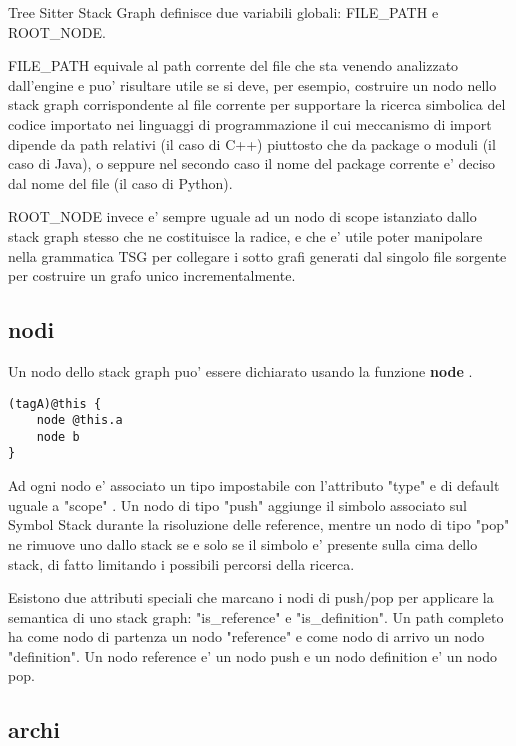 Tree Sitter Stack Graph definisce due variabili globali: FILE\_PATH e ROOT\_NODE.

FILE\_PATH equivale al path corrente del file che sta venendo analizzato dall'engine e puo' risultare utile se si deve, per esempio, costruire un nodo nello stack graph corrispondente al file corrente per supportare la ricerca simbolica del codice importato nei linguaggi di programmazione il cui meccanismo di import dipende da path relativi (il caso di C++) piuttosto che da package o moduli (il caso di Java), o seppure nel secondo caso il nome del package corrente e' deciso dal nome del file (il caso di Python).

ROOT\_NODE invece e' sempre uguale ad un nodo di scope istanziato dallo stack graph stesso che ne costituisce la radice, e che e' utile poter manipolare nella grammatica TSG per collegare i sotto grafi generati dal singolo file sorgente per costruire un grafo unico incrementalmente.

\subsection{nodi}

Un nodo dello stack graph puo' essere dichiarato usando la funzione \textbf{node} \cite{TreeSitterGraphReferenceGraphNodes}.

\begin{Verbatim}[samepage=true]
(tagA)@this {
    node @this.a
    node b
}
\end{Verbatim}

Ad ogni nodo e' associato un tipo impostabile con l'attributo "type" e di default uguale a "scope" \cite{TreeSitterStackGraphNodes}.
Un nodo di tipo "push" aggiunge il simbolo associato sul Symbol Stack durante la risoluzione delle reference, mentre un nodo di tipo "pop" ne rimuove uno dallo stack se e solo se il simbolo e' presente sulla cima dello stack, di fatto limitando i possibili percorsi della ricerca.

Esistono due attributi speciali che marcano i nodi di push/pop per applicare la semantica di uno stack graph: "is\_reference" e "is\_definition".
Un path completo ha come nodo di partenza un nodo "reference" e come nodo di arrivo un nodo "definition".
Un nodo reference e' un nodo push e un nodo definition e' un nodo pop.

\subsection{archi}

